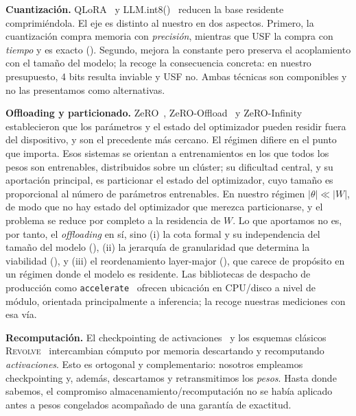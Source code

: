\documentclass[journal]{IEEEtran}
\newcommand{\usf}{USF}
\begin{document}
\textbf{Cuantización.} QLoRA~\cite{dettmers2023qlora} y LLM.int8()~\cite{dettmers2022int8} reducen
la base residente comprimiéndola. El eje es distinto al nuestro en dos aspectos. Primero, la
cuantización compra memoria con \emph{precisión}, mientras que \usf{} la compra con \emph{tiempo} y
es exacto (). Segundo, mejora la constante pero preserva el acoplamiento con el
tamaño del modelo; la  recoge la consecuencia concreta: en nuestro presupuesto, 4
bits resulta inviable y \usf{} no. Ambas técnicas son componibles y no las presentamos como
alternativas.

\textbf{Offloading y particionado.} ZeRO~\cite{rajbhandari2020zero},
ZeRO-Offload~\cite{ren2021zerooffload} y ZeRO-Infinity~\cite{rajbhandari2021zeroinfinity}
establecieron que los parámetros y el estado del optimizador pueden residir fuera del dispositivo,
y son el precedente más cercano. El régimen difiere en el punto que importa. Esos sistemas se
orientan a entrenamientos en los que todos los pesos son entrenables, distribuidos sobre un clúster;
su dificultad central, y su aportación principal, es particionar el estado del optimizador, cuyo
tamaño es proporcional al número de parámetros entrenables. En nuestro régimen
$|\theta| \ll |W|$, de modo que no hay estado del optimizador que merezca particionarse, y el
problema se reduce por completo a la residencia de $W$. Lo que aportamos no es, por tanto, el
\emph{offloading} en sí, sino (i) la cota formal y su independencia del tamaño del modelo
(), (ii) la jerarquía de granularidad que determina la viabilidad
(), y (iii) el reordenamiento layer-major (), que carece de propósito
en un régimen donde el modelo es residente. Las bibliotecas de despacho de producción como
\texttt{accelerate}~\cite{accelerate2022} ofrecen ubicación en CPU/disco a nivel de módulo,
orientada principalmente a inferencia; la  recoge nuestras mediciones con esa vía.

\textbf{Recomputación.} El checkpointing de activaciones~\cite{chen2016checkpointing} y los
esquemas clásicos \textsc{Revolve}~\cite{griewank2000revolve} intercambian cómputo por memoria
descartando y recomputando \emph{activaciones}. Esto es ortogonal y complementario: nosotros
empleamos checkpointing y, además, descartamos y retransmitimos los \emph{pesos}. Hasta donde
sabemos, el compromiso almacenamiento/recomputación no se había aplicado antes a pesos congelados
acompañado de una garantía de exactitud.
\end{document}

